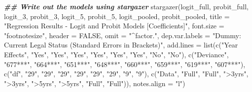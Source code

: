 \documentclass[a4paper,nobind]{templates/ociamthesis}
\newenvironment{Shaded}{\begin{snugshade}}{\end{snugshade}}
\newcommand{\AttributeTok}[1]{\textcolor[rgb]{0.77,0.63,0.00}{#1}}
\newcommand{\ConstantTok}[1]{\textcolor[rgb]{0.00,0.00,0.00}{#1}}
\newcommand{\DocumentationTok}[1]{\textcolor[rgb]{0.56,0.35,0.01}{\textbf{\textit{#1}}}}
\newcommand{\FunctionTok}[1]{\textcolor[rgb]{0.00,0.00,0.00}{#1}}
\newcommand{\NormalTok}[1]{#1}
\newcommand{\StringTok}[1]{\textcolor[rgb]{0.31,0.60,0.02}{#1}}
\renewenvironment{Shaded}
{
  \vspace{10pt}%
  \begin{snugshade}%
}{%
  \end{snugshade}%
  \vspace{8pt}%
}
\begin{document}
\begin{landscape}

\begin{Shaded}
\begin{Highlighting}[]
\DocumentationTok{\#\# Write out the models using stargazer}
\FunctionTok{stargazer}\NormalTok{(logit\_full, probit\_full, logit\_3, probit\_3, logit\_5, probit\_5, logit\_pooled, probit\_pooled, }\AttributeTok{title =} \StringTok{"Regression Results {-} Logit and Probit Models [Coefficients]"}\NormalTok{, }\AttributeTok{font.size =} \StringTok{"footnotesize"}\NormalTok{, }\AttributeTok{header =} \ConstantTok{FALSE}\NormalTok{, }\AttributeTok{omit =} \StringTok{"\^{}factor."}\NormalTok{, }\AttributeTok{dep.var.labels =} \StringTok{"Dummy: Current Legal Status (Standard Errors in Brackets)"}\NormalTok{, }\AttributeTok{add.lines =} \FunctionTok{list}\NormalTok{(}\FunctionTok{c}\NormalTok{(}\StringTok{"Year Effects"}\NormalTok{, }\StringTok{"Yes"}\NormalTok{, }\StringTok{"Yes"}\NormalTok{, }\StringTok{"Yes"}\NormalTok{, }\StringTok{"Yes"}\NormalTok{, }\StringTok{"Yes"}\NormalTok{, }\StringTok{"Yes"}\NormalTok{, }\StringTok{"No"}\NormalTok{, }\StringTok{"No"}\NormalTok{), }\FunctionTok{c}\NormalTok{(}\StringTok{"Deviance"}\NormalTok{, }\StringTok{"677***"}\NormalTok{, }\StringTok{"664***"}\NormalTok{, }\StringTok{"651***"}\NormalTok{, }\StringTok{"648***"}\NormalTok{, }\StringTok{"660***"}\NormalTok{, }\StringTok{"659***"}\NormalTok{, }\StringTok{"619***"}\NormalTok{, }\StringTok{"607***"}\NormalTok{), }\FunctionTok{c}\NormalTok{(}\StringTok{"df"}\NormalTok{, }\StringTok{"29"}\NormalTok{, }\StringTok{"29"}\NormalTok{, }\StringTok{"29"}\NormalTok{, }\StringTok{"29"}\NormalTok{, }\StringTok{"29"}\NormalTok{, }\StringTok{"29"}\NormalTok{, }\StringTok{"9"}\NormalTok{, }\StringTok{"9"}\NormalTok{),}
\FunctionTok{c}\NormalTok{(}\StringTok{"Data"}\NormalTok{, }\StringTok{"Full"}\NormalTok{, }\StringTok{"Full"}\NormalTok{, }\StringTok{"\textgreater{}3yrs"}\NormalTok{, }\StringTok{"\textgreater{}3yrs"}\NormalTok{, }\StringTok{"\textgreater{}5yrs"}\NormalTok{, }\StringTok{"\textgreater{}5yrs"}\NormalTok{, }\StringTok{"Full"}\NormalTok{, }\StringTok{"Full"}\NormalTok{)), }\AttributeTok{notes.align =} \StringTok{"l"}\NormalTok{)}
\end{Highlighting}
\end{Shaded}


\end{landscape}
\end{document}
